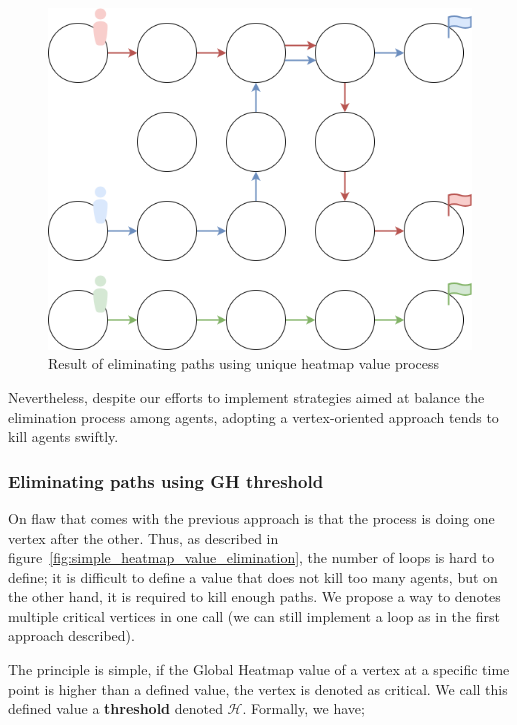 \begin{figure}[H]
    \centering
    \caption{Result of eliminating paths using unique heatmap value process}\label{fig:simple_heatmap_value_elimination_example_result}
    \includegraphics[width=\widthimg]{img/pe_one_heatmap_value_example_result.drawio.png}
\end{figure}

Nevertheless, despite our efforts to implement strategies aimed at balance the elimination process among agents, adopting a vertex-oriented approach tends to kill agents swiftly.

\subsubsection{Eliminating paths using GH threshold}

On flaw that comes with the previous approach is that the process is doing one vertex after the other. Thus, as described in figure~\ref{fig:simple_heatmap_value_elimination}, the number of loops is hard to define; it is difficult to define a value that does not kill too many agents, but on the other hand, it is required to kill enough paths. We propose a way to denotes multiple critical vertices in one call (we can still implement a loop as in the first approach described).

The principle is simple, if the Global Heatmap value of a vertex at a specific time point is higher than a defined value, the vertex is denoted as critical. We call this defined value a \textbf{threshold} denoted \(\mathcal{H}\). Formally, we have;

